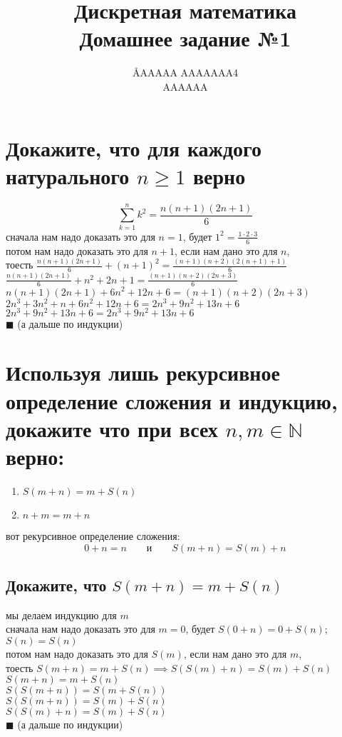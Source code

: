 \documentclass{article}
\title{Дискретная математика \\ Домашнее задание №1}
\author{\AA{AAAAA AAAAAAA}{4} \\ AAAAAA}
\newcommand{\ds}{\displaystyle}
\begin{document}
  \maketitle

  \section{Докажите, что для каждого натурального $n \geq 1$ верно}
  $$\sum_{k=1}^n k^2 = \frac{n(n+1)(2n+1)}{6}$$
  сначала нам надо доказать это для $n=1$, будет $\ds 1^2 = \frac{1 \cdot 2 \cdot 3}{6}$ \\
  потом нам надо доказать это для $n+1$, если нам дано это для $n$, \\
  тоесть $\ds \frac{n(n+1)(2n+1)}{6} + (n+1)^2 = \frac{(n+1)(n+2)(2(n+1)+1)}{6}$ \\
  $\ds \frac{n(n+1)(2n+1)}{6} + n^2 + 2n + 1 = \frac{(n+1)(n+2)(2n+3)}{6}$ \\
  $\ds n(n+1)(2n+1) + 6n^2 + 12n + 6 = (n+1)(n+2)(2n+3)$ \\
  $\ds 2n^3 + 3n^2 + n + 6n^2 + 12n + 6 = 2n^3 + 9n^2 + 13n + 6$ \\
  $\ds 2n^3 + 9n^2 + 13n + 6 = 2n^3 + 9n^2 + 13n + 6$ \\
  $\blacksquare$ (а дальше по индукции)

  \section{Используя лишь рекурсивное определение сложения и индукцию, докажите что при всех $n, m \in \mathbb{N}$ верно:}
  \begin{center}
    \begin{varwidth}{\textwidth}
      \begin{enumerate}
        \item $S(m+n) = m+S(n)$
        \item $n+m = m+n$
      \end{enumerate}
    \end{varwidth}
  \end{center}
  вот рекурсивное определение сложения:
  $$ 0+n=n \qquad \textrm{и} \qquad S(m+n) = S(m)+n $$
  \subsection{Докажите, что $S(m+n) = m+S(n)$}
  \label{recsymetry}
  мы делаем индукцию для $m$ \\
  сначала нам надо доказать это для $m=0$, будет $ S(0+n) = 0+S(n) $; $S(n)=S(n)$ \\
  потом нам надо доказать это для $S(m)$, если нам дано это для $m$, \\
  тоесть $ S(m+n) = m+S(n) \implies S(S(m)+n) = S(m)+S(n) $ \\
  $ S(m+n) = m+S(n) $ \\
  $ S(S(m+n)) = S(m+S(n)) $ \\
  $ S(S(m+n)) = S(m)+S(n) $ \\
  $ S(S(m)+n) = S(m)+S(n) $ \\
  $\blacksquare$ (а дальше по индукции)
\end{document}
